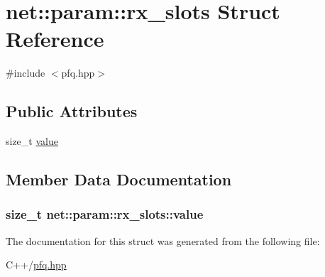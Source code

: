 \hypertarget{structnet_1_1param_1_1rx__slots}{\section{net\+:\+:param\+:\+:rx\+\_\+slots Struct Reference}
\label{structnet_1_1param_1_1rx__slots}
}


{\ttfamily \#include $<$pfq.\+hpp$>$}

\subsection*{Public Attributes}
\begin{DoxyCompactItemize}
\item 
size\+\_\+t \hyperlink{structnet_1_1param_1_1rx__slots_a7faa81257d9e7f5d55d33e5893f238b8}{value}
\end{DoxyCompactItemize}


\subsection{Member Data Documentation}
\hypertarget{structnet_1_1param_1_1rx__slots_a7faa81257d9e7f5d55d33e5893f238b8}{
\subsubsection[{value}]{\setlength{\rightskip}{0pt plus 5cm}size\+\_\+t net\+::param\+::rx\+\_\+slots\+::value}}\label{structnet_1_1param_1_1rx__slots_a7faa81257d9e7f5d55d33e5893f238b8}


The documentation for this struct was generated from the following file\+:\begin{DoxyCompactItemize}
\item 
C++/\hyperlink{pfq_8hpp}{pfq.\+hpp}\end{DoxyCompactItemize}
